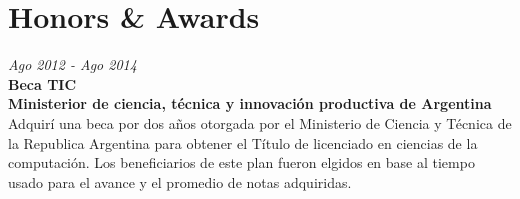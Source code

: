 \section{Honors \& Awards}

\begin{large}
    \textit{Ago 2012 - Ago 2014}\\
    \textbf{Beca TIC}\\
    \textbf{Ministerior de ciencia, técnica y innovación productiva de Argentina}\\
    Adquirí una beca por dos años otorgada por el Ministerio de Ciencia y Técnica de la Republica
   Argentina para obtener el Título de licenciado en ciencias de la computación. Los beneficiarios de
   este plan fueron elgidos en base al tiempo usado para el avance y el promedio de notas adquiridas.
\end{large}

